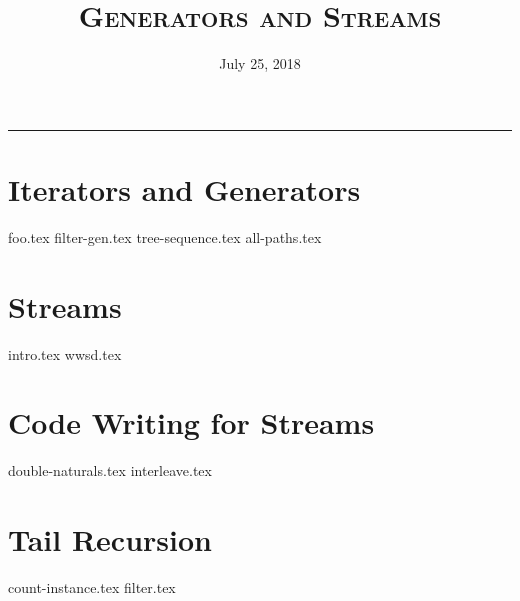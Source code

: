 \documentclass{exam}
\title{\textsc{Generators and Streams}}
\date{July 25, 2018}
\begin{document}
\maketitle
\rule{\textwidth}{0.15em}
\fontsize{12}{15}\selectfont


\section{Iterators and Generators}
\begin{questions}
{foo.tex}
\newpage
{filter-gen.tex}
\newpage
{tree-sequence.tex}
{all-paths.tex}
\end{questions}


\newpage
\section{Streams}
\begin{questions}
{intro.tex}
\newpage
{wwsd.tex}
\end{questions}
\newpage
\section{Code Writing for Streams}
\begin{questions}
{double-naturals.tex}
{interleave.tex}
\end{questions}

\newpage

\section{Tail Recursion}
\begin{questions}
{count-instance.tex}
{filter.tex}
\end{questions}




\end{document}
